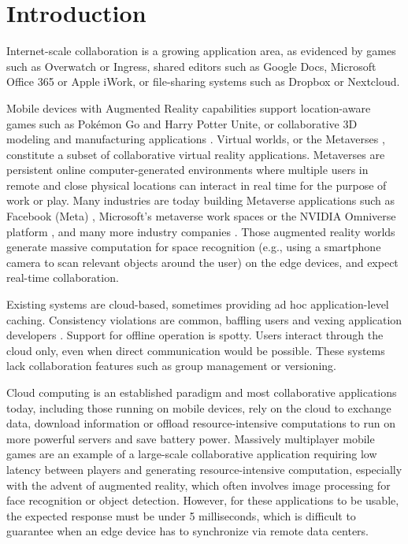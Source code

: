 %
\chapter{Introduction}
\label{sec:intro}

Internet-scale collaboration is a growing application
area, as evidenced by games such as Overwatch or Ingress,
shared editors such as Google Docs, Microsoft Office 365 or Apple
iWork, or
file-sharing systems such as Dropbox or Nextcloud.

Mobile devices with Augmented Reality capabilities support
location-aware games such as Pokémon Go and Harry Potter Unite, or
collaborative 3D modeling and manufacturing applications
\cite{wang2019comprehensive, collaborativeARusecase, schafer2021survey}.
Virtual worlds, or the Metaverses \cite{dionisio20133d}, 
constitute a subset of collaborative virtual reality applications.
Metaverses are persistent online computer-generated environments where multiple 
users in remote and close physical locations can interact in real time for the 
purpose of work or play.
Many industries are today building Metaverse applications such as Facebook 
(Meta) \cite{Connect213:online},
Microsoft's metaverse work spaces \cite{Microsof66:online} or 
the NVIDIA Omniverse platform \cite{WhatIsth95:online}, 
and many more industry companies \cite{dionisio20133d}.
Those augmented reality worlds generate massive computation for space recognition 
(e.g., using a smartphone camera to scan relevant objects around the user)
on the edge devices, and expect real-time collaboration.

Existing systems are cloud-based, sometimes providing ad hoc
application-level caching.
Consistency violations are common, baffling users and vexing application
developers
\cite{fic:rep:sh172,app:rep:1835,Google-docs-support-offline-issues,Google-docs-offline-issues-complaints,pokemon-go-object-duplication}.
Support for offline operation is spotty.
Users interact through the cloud only, even when direct communication
would be possible.
These systems lack collaboration features such as group management or
versioning.

Cloud computing is an established paradigm and most collaborative applications 
today, 
including those running on mobile devices, rely on the cloud to exchange data, 
download information or offload resource-intensive computations to run on more 
powerful servers and save battery power. 
Massively multiplayer mobile games are an example of a large-scale collaborative
application requiring low latency between players and generating 
resource-intensive computation, 
especially with the advent of augmented reality,
which often involves image 
processing for face recognition or object detection. 
However, for these applications to be usable, the expected response 
must be under 5 milliseconds, which is difficult to 
guarantee when an edge device has to synchronize via remote data centers.

